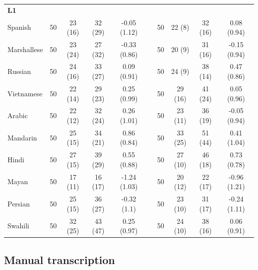\documentclass [PhD] {uclathes}
\begin{document}
\begin{table}[htbp]
\begin{tabular}{lccccccccc}
\textbf{L1} &  &  &  &  & &  &  &  &  \\
\hspace{3mm} Spanish & 50 & 23 (16) & 32 (29) & -0.05 (1.12) & & 50 & 22 (8) & 32 (16) & 0.08 (0.94) \\
\hspace{3mm} Marshallese & 50 & 23 (24) & 27 (32) & -0.33 (0.86) & & 50 & 20 (9) & 31 (16) & -0.15 (0.94) \\
\hspace{3mm} Russian & 50 & 24 (16) & 33 (27) & 0.09 (0.91) & & 50 & 24 (9) & 38 (14) & 0.47 (0.86) \\
\hspace{3mm} Vietnamese & 50 & 22 (14) & 29 (23) & 0.25 (0.99) & & 50 & 29 (16) & 41 (24) & 0.05 (0.96) \\
\hspace{3mm} Arabic & 50 & 22 (12) & 32 (24) & 0.26 (1.01) & & 50 & 23 (11) & 36 (19) & -0.05 (0.94) \\
\hspace{3mm} Mandarin & 50 & 25 (15) & 34 (21) & 0.86 (0.84) & & 50 & 33 (25) & 51 (44) & 0.41 (1.04) \\
\hspace{3mm} Hindi & 50 & 27 (15) & 39 (29) & 0.55 (0.88) & & 50 & 27 (10) & 46 (18) & 0.73 (0.78) \\
\hspace{3mm} Mayan & 50 & 17 (11) & 16 (17) & -1.24 (1.03) & & 50 & 20 (12) & 22 (17) & -0.96 (1.21) \\
\hspace{3mm} Persian & 50 & 25 (15) & 36 (27) & -0.32 (1.1) & & 50 & 23 (10) & 31 (17) & -0.24 (1.11) \\
\hspace{3mm} Swahili & 50 & 32 (25) & 43 (47) & 0.25 (0.97) & & 50 & 24 (10) & 38 (16) & 0.06 (0.91) \\    \bottomrule
    \end{tabular}
\end{table}

\subsection{Manual transcription}
\end{document}
